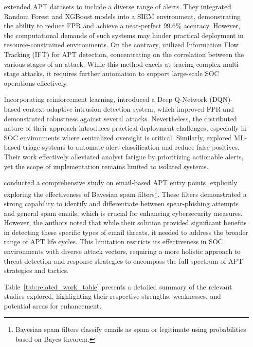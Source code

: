 \textcite{Ali2024} extended APT datasets to include a diverse range of alerts. 
They integrated Random Forest and XGBoost models into a SIEM environment, demonstrating the ability to reduce FPR and achieve a near-perfect 99.6\% accuracy. 
However, the computational demands of such systems may hinder practical deployment in resource-constrained environments.
On the contrary, \textcite{Brogi2016} utilized Information Flow Tracking (IFT) for APT detection, concentrating on the correlation between the various stages of an attack. 
While this method excels at tracing complex multi-stage attacks, it requires further automation to support large-scale SOC operations effectively.

Incorporating reinforcement learning, \textcite{Sethi2020} introduced a Deep Q-Network (DQN)-based context-adaptive intrusion detection system, which improved FPR and demonstrated robustness against several attacks. 
Nevertheless, the distributed nature of their approach introduces practical deployment challenges, especially in SOC environments where centralized oversight is critical. 
Similarly, \textcite{Nila2020} explored ML-based triage systems to automate alert classification and reduce false positives. 
Their work effectively alleviated analyst fatigue by prioritizing actionable alerts, yet the scope of implementation remains limited to isolated systems.

\textcite{Chandra2016} conducted a comprehensive study on email-based APT entry points, explicitly exploring the effectiveness of Bayesian spam filters\footnote{Bayesian spam filters classify emails as spam or legitimate using probabilities based on Bayes theorem.}.
These filters demonstrated a strong capability to identify and differentiate between spear-phishing attempts and general spam emails, which is crucial for enhancing cybersecurity measures. 
However, the authors noted that while their solution provided significant benefits in detecting these specific types of email threats, it needed to address the broader range of APT life cycles.
This limitation restricts its effectiveness in SOC environments with diverse attack vectors, requiring a more holistic approach to threat detection and response strategies to encompass the full spectrum of APT strategies and tactics.

Table~\ref{tab:related_work_table} presents a detailed summary of the relevant studies explored, highlighting their respective strengths, weaknesses, and potential areas for enhancement.

